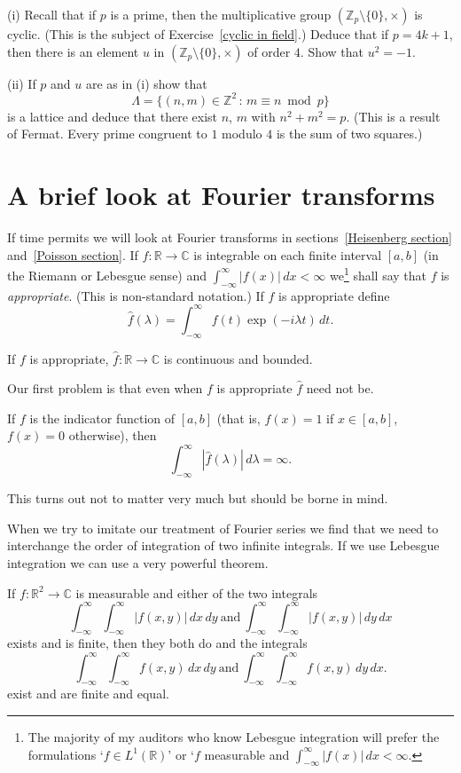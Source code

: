 \begin{exercise} (i) Recall that if $p$
is a prime, then the
multiplicative group $({\mathbb Z}_{p}\setminus\{0\},\times)$
is cyclic. (This is the subject of Exercise~\ref{cyclic in field}.)
Deduce that if $p=4k+1$, then there is an element $u$ in
$({\mathbb Z}_{p}\setminus\{0\},\times)$ of order $4$.
Show that $u^{2}=-1$.

(ii) If $p$ and $u$ are as in (i) show that
\[\Lambda=\{(n,m)\in{\mathbb Z}^{2}
\, : \,
m\equiv n \bmod p\}\]
is a lattice and deduce that there exist $n$, $m$ with
$n^{2}+m^{2}=p$. (This is a result of Fermat. Every
prime congruent to $1$ modulo $4$ is the sum of two
squares.)
\end{exercise}
\section{A brief look at Fourier transforms}\label{brief}
If time permits
we will look at Fourier transforms in sections~\ref{Heisenberg section}
and~\ref{Poisson section}. If $f:{\mathbb R}\rightarrow{\mathbb C}$
is integrable on each finite interval $[a,b]$
(in the Riemann or Lebesgue sense)
and $\int_{-\infty}^{\infty}|f(x)|\,dx<\infty$
we\footnote{The majority
of my auditors who know Lebesgue integration will
prefer the formulations `$f\in L^{1}({\mathbb R})$'
or `$f$ measurable and $\int_{-\infty}^{\infty}|f(x)|\,dx<\infty$.}
shall say that $f$ is \emph{appropriate}.
(This is non-standard notation.)
If $f$ is appropriate define
\[\hat{f}(\lambda)
=\int_{-\infty}^{\infty}f(t)\exp(-i\lambda t)\, dt.\]

\begin{lemma} If $f$ is appropriate,
$\hat{f}:{\mathbb R}\rightarrow{\mathbb C}$ is continuous
and bounded.
\end{lemma}
Our first problem is that even when $f$ is appropriate
$\hat{f}$ need not be.
\begin{example} If $f$ is the indicator function of
$[a,b]$ (that is, $f(x)=1$ if $x\in [a,b]$, $f(x)=0$
otherwise), then
\[\int_{-\infty}^{\infty}|\hat{f}(\lambda)|\,d\lambda=\infty.\]
\end{example}
This turns out not to matter very much but should be borne in mind.

When we try to imitate our treatment of Fourier series
we find that we need to interchange the order of
integration of two infinite integrals. If we use
Lebesgue integration we can use a very powerful
theorem.
\begin{theorem} If
$f:{\mathbb R}^{2}\rightarrow{\mathbb C}$ is measurable
and either of the two integrals
\[\int_{-\infty}^{\infty}
\int_{-\infty}^{\infty}|f(x,y)|\,dx\,dy\ \text{and}
\ \int_{-\infty}^{\infty}
\int_{-\infty}^{\infty}|f(x,y)|\,dy\,dx\]
exists and is finite, then they both do and the integrals
\[\int_{-\infty}^{\infty}
\int_{-\infty}^{\infty}f(x,y)\,dx\,dy\ \text{and}
\ \int_{-\infty}^{\infty}
\int_{-\infty}^{\infty}f(x,y)\,dy\,dx.\]
exist and are finite and equal.
\end{theorem}

